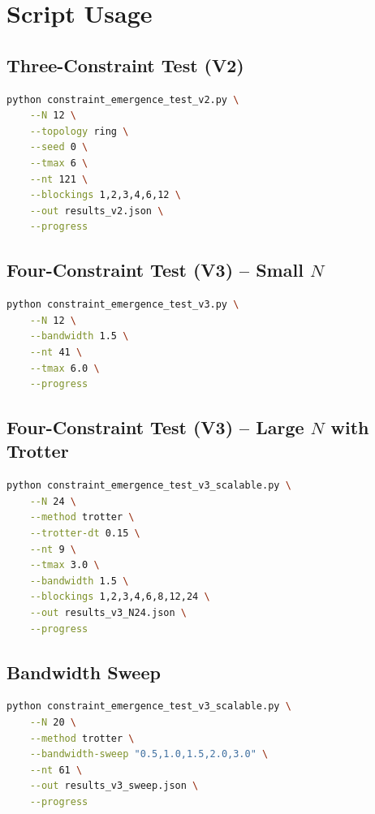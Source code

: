 \documentclass[11pt]{article}
\begin{document}
\section{Script Usage}

\subsection{Three-Constraint Test (V2)}

\begin{lstlisting}[language=bash]
python constraint_emergence_test_v2.py \
    --N 12 \
    --topology ring \
    --seed 0 \
    --tmax 6 \
    --nt 121 \
    --blockings 1,2,3,4,6,12 \
    --out results_v2.json \
    --progress
\end{lstlisting}

\subsection{Four-Constraint Test (V3) -- Small $N$}

\begin{lstlisting}[language=bash]
python constraint_emergence_test_v3.py \
    --N 12 \
    --bandwidth 1.5 \
    --nt 41 \
    --tmax 6.0 \
    --progress
\end{lstlisting}

\subsection{Four-Constraint Test (V3) -- Large $N$ with Trotter}

\begin{lstlisting}[language=bash]
python constraint_emergence_test_v3_scalable.py \
    --N 24 \
    --method trotter \
    --trotter-dt 0.15 \
    --nt 9 \
    --tmax 3.0 \
    --bandwidth 1.5 \
    --blockings 1,2,3,4,6,8,12,24 \
    --out results_v3_N24.json \
    --progress
\end{lstlisting}

\subsection{Bandwidth Sweep}

\begin{lstlisting}[language=bash]
python constraint_emergence_test_v3_scalable.py \
    --N 20 \
    --method trotter \
    --bandwidth-sweep "0.5,1.0,1.5,2.0,3.0" \
    --nt 61 \
    --out results_v3_sweep.json \
    --progress
\end{lstlisting}
\end{document}
